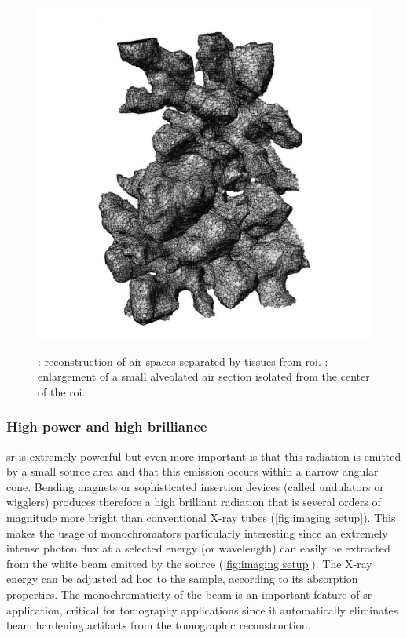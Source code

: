 \begin{figure}
{{			\includegraphics[width=\imsize]{img/Tsuda2008/Tsuda-09b}%
			\label{subfig:tsuda-09b}%
		}%
	}%
	\caption[\threed reconstruction of air spaces]{: reconstruction of \threed air spaces separated by tissues from \ac{roi}. : enlargement of a small alveolated air section isolated from the center of the \ac{roi}.}
	\label{fig:tsuda-09}
\end{figure}

\subsubsection{High power and high brilliance}
\ac{sr} is extremely powerful but even more important is that this radiation is emitted by a small source area and that this emission occurs within a narrow angular cone. Bending magnets or sophisticated insertion devices (called undulators or wigglers) produces therefore a high brilliant radiation that is several orders of magnitude more bright than conventional X-ray tubes (\autoref{fig:imaging setup}). This makes the usage of monochromators particularly interesting since an extremely intense photon flux at a selected energy (or wavelength) can easily be extracted from the white beam emitted by the source (\autoref{fig:imaging setup}). The X-ray energy can be adjusted ad hoc to the sample, according to its absorption properties. The monochromaticity of the beam is an important feature of \ac{sr} application, critical for tomography applications since it automatically eliminates beam hardening artifacts from the tomographic reconstruction.

